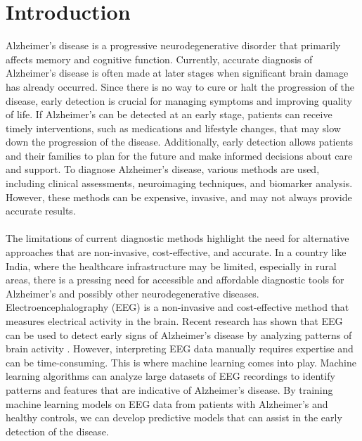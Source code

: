 \documentclass[openany]{book}
\begin{document}
\chapter*{Introduction}
    Alzheimer's disease is a progressive neurodegenerative disorder that primarily affects memory and cognitive function. Currently, accurate diagnosis of Alzheimer's disease is often made at later stages when significant brain damage has already occurred. Since there is no way to cure or halt the progression of the disease, early detection is crucial for managing symptoms and improving quality of life. If Alzheimer's can be detected at an early stage, patients can receive timely interventions, such as medications and lifestyle changes, that may slow down the progression of the disease. Additionally, early detection allows patients and their families to plan for the future and make informed decisions about care and support. To diagnose Alzheimer's disease, various methods are used, including clinical assessments, neuroimaging techniques, and biomarker analysis. However, these methods can be expensive, invasive, and may not always provide accurate results. \\ \\ The limitations of current diagnostic methods highlight the need for alternative approaches that are non-invasive, cost-effective, and accurate. In a country like India, where the healthcare infrastructure may be limited, especially in rural areas, there is a pressing need for accessible and affordable diagnostic tools for Alzheimer's and possibly other neurodegenerative diseases. Electroencephalography (EEG) is a non-invasive and cost-effective method that measures electrical activity in the brain. Recent research has shown that EEG can be used to detect early signs of Alzheimer's disease by analyzing patterns of brain activity \cite{cassani2020review, jeong2004eeg}. However, interpreting EEG data manually requires expertise and can be time-consuming. This is where machine learning comes into play. Machine learning algorithms can analyze large datasets of EEG recordings to identify patterns and features that are indicative of Alzheimer's disease. By training machine learning models on EEG data from patients with Alzheimer's and healthy controls, we can develop predictive models that can assist in the early detection of the disease. \\ \\
\end{document}
